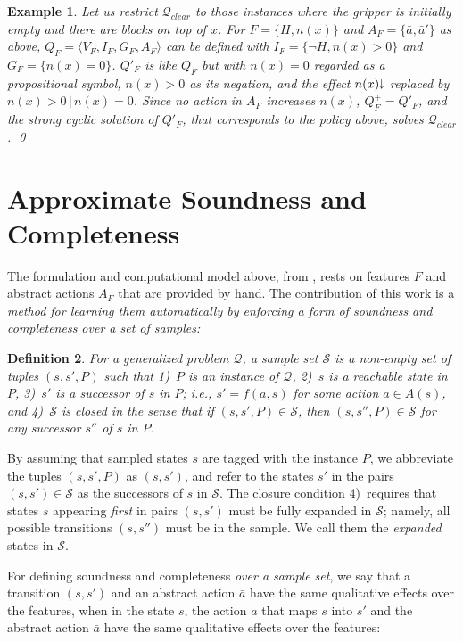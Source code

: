 \documentclass[letterpaper]{article} %
\newcommand{\tup}[1]{\langle #1 \rangle}
\newtheorem{definition}{Definition}
\newtheorem{example}[definition]{Example}
\newcommand{\Q}{\mathcal{Q}}
\renewcommand{\S}{\mathcal{S}}
\newcommand{\mminus}{\hspace{-.05em}\raisebox{.15ex}{\footnotesize$\downarrow$}}
\begin{document}
\begin{example}
  Let us restrict  $\Q_{clear}$  to those  instances where  the gripper is initially empty
  and there are blocks on top of $x$. For $F=\{H,n(x)\}$  and $A_F=\{\bar{a},\bar{a}'\}$ as above, 
  $Q_F=\tup{V_F,I_F,G_F,A_F}$ can be defined with $I_F=\{\neg H, n(x) > 0\}$ and $G_F=\{n(x)=0\}$.
  $Q'_F$ is like $Q_F$ but with $n(x)=0$ regarded as a propositional symbol, $n(x) > 0$
  as its negation, and the effect $n(x)\mminus$ replaced by  $n(x) > 0 \, | \, n(x)=0$.
  Since  no action in $A_F$  increases $n(x)$,   $Q^+_F=Q'_F$, and the strong cyclic solution  of $Q'_F$,
  that corresponds to the policy above, solves $\Q_{clear}$. \qed
\end{example}


\section{Approximate Soundness and Completeness}

The formulation and   computational model above, from  \cite{bonet:ijcai2018}, 
rests  on features $F$ and  abstract actions $A_F$ that are provided by hand.
The contribution of this work is a \emph{method for  learning   them automatically
by enforcing a form of soundness and completeness over a set of samples:}

\begin{definition}
  For a generalized problem $\Q$, a \emph{sample set}  $\S$ is a non-empty set of tuples  $(s,s',P)$
  such that 1)~$P$ is an instance of $\Q$, 2)~$s$ is a reachable state in $P$, 3)~$s'$
  is a successor of $s$ in $P$; i.e., $s'=f(a,s)$ for some action $a \in A(s)$,
  and
  4)~$\S$ is closed in the sense  that if $(s,s',P) \in \S$, then $(s,s'',P) \in \S$  for any successor $s''$ 
  of $s$ in $P$.
\end{definition}

By assuming that sampled states $s$ are tagged with the instance $P$, 
we abbreviate the tuples $(s,s',P)$ as $(s,s')$, and refer to the
states $s'$ in  the pairs $(s,s') \in \S$ as the successors of
$s$ in $\S$. The  closure condition 4)~requires that
states $s$ appearing \emph{first} in pairs $(s,s')$ must be fully expanded in $\S$;
namely, all possible transitions $(s,s'')$ must be  in the sample. We call them
the \emph{expanded} states in $\S$.

For defining soundness and completeness \emph{over a sample set}, we say that  a transition $(s,s')$ and an abstract action $\bar{a}$
have  the same qualitative effects over the features,   when in the  state $s$,  the action $a$ that maps $s$ into $s'$ and the abstract action
$\bar{a}$ have the same qualitative effects over the features:
\end{document}
